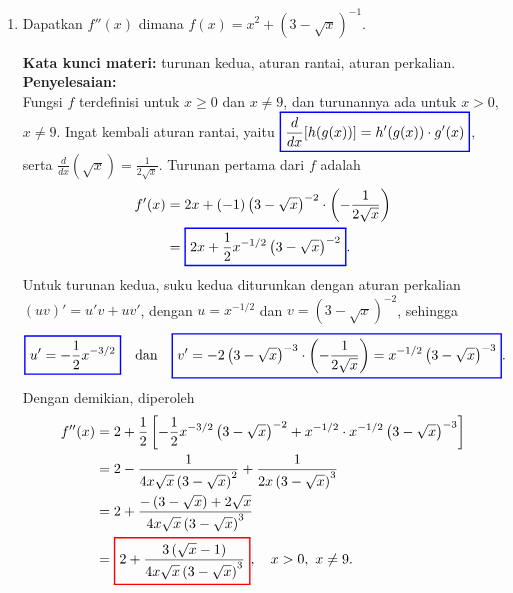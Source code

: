 \documentclass[10pt,openany,a4paper]{article}
\theoremstyle{definition}
\theoremstyle{definition}
\theoremstyle{plain}
\newenvironment{jawab}[2][tes]{%
\par\noindent\textbf{Kata kunci materi:} #1.\\
\textbf{Penyelesaian:} #2%
}{}
\begin{document}
\begin{enumerate}
    \item Dapatkan $f''(x)$ dimana $f(x)=x^2+\left(3-\sqrt{x}\right)^{-1}$.
    \begin{jawab}[turunan kedua, aturan rantai, aturan perkalian]{~\\
        Fungsi $f$ terdefinisi untuk $x\geq 0$ dan $x\neq 9$, dan turunannya ada untuk $x>0$, $x\neq 9$. Ingat kembali aturan rantai, yaitu $\colorlet{oldcolor}{.}
        \color{blue}
        \setlength{\fboxrule}{1pt} \boxed{\color{oldcolor}\frac{d}{dx}[h(g(x))] = h'(g(x)) \cdot g'(x)}\color{oldcolor}$, serta $\frac{d}{dx}\left(\sqrt{x}\right)=\frac{1}{2\sqrt{x}}$. Turunan pertama dari $f$ adalah
        \begin{align*}
            f'(x) &= 2x + (-1)\left(3-\sqrt{x}\right)^{-2}\cdot\left(-\frac{1}{2\sqrt{x}}\right)\\
            &= \colorlet{oldcolor}{.}
        \color{blue}
        \setlength{\fboxrule}{1pt} \boxed{\color{oldcolor}2x + \frac{1}{2}x^{-1/2}\left(3-\sqrt{x}\right)^{-2}}\color{oldcolor}.
        \end{align*}
        Untuk turunan kedua, suku kedua diturunkan dengan aturan perkalian $(uv)'=u'v+uv'$, dengan $u=x^{-1/2}$ dan $v=\left(3-\sqrt{x}\right)^{-2}$, sehingga
        \begin{align*}
            \colorlet{oldcolor}{.}
        \color{blue}
        \setlength{\fboxrule}{1pt} \boxed{\color{oldcolor}u'=-\frac{1}{2}x^{-3/2}}\color{oldcolor} \quad\text{dan}\quad \colorlet{oldcolor}{.}
        \color{blue}
        \setlength{\fboxrule}{1pt} \boxed{\color{oldcolor}v'=-2\left(3-\sqrt{x}\right)^{-3}\cdot\left(-\frac{1}{2\sqrt{x}}\right)=x^{-1/2}\left(3-\sqrt{x}\right)^{-3}}\color{oldcolor}.
        \end{align*}
        Dengan demikian, diperoleh
        \begin{align*}
            f''(x) &= 2 + \frac{1}{2}\left[-\frac{1}{2}x^{-3/2}\left(3-\sqrt{x}\right)^{-2} + x^{-1/2}\cdot x^{-1/2}\left(3-\sqrt{x}\right)^{-3}\right]\\
            &= 2 - \frac{1}{4x\sqrt{x}\left(3-\sqrt{x}\right)^{2}} + \frac{1}{2x\left(3-\sqrt{x}\right)^{3}}\\
            &= 2 + \frac{-\left(3-\sqrt{x}\right) + 2\sqrt{x}}{4x\sqrt{x}\left(3-\sqrt{x}\right)^{3}}\\
            &= \colorlet{oldcolor}{.}
        \color{red}
        \setlength{\fboxrule}{1pt} \boxed{\color{oldcolor}2 + \frac{3\left(\sqrt{x}-1\right)}{4x\sqrt{x}\left(3-\sqrt{x}\right)^{3}}}\color{oldcolor}, \quad x>0,~x\neq 9.
        \end{align*}
    }
    \end{jawab}
\end{enumerate}
\end{document}

